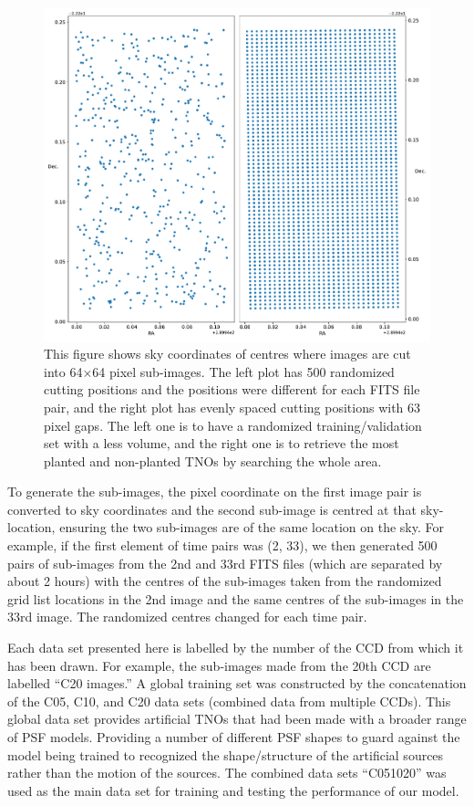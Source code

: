 \begin{figure}[ht]
    \centering
    \includegraphics[width=\textwidth,keepaspectratio]{Figures/grid.pdf}
    \caption{This figure shows sky coordinates of centres where images are cut into 64$\times$64 pixel sub-images.
    The left plot has 500 randomized cutting positions and the positions were different for each FITS file pair, and the right plot has evenly spaced cutting positions with 63 pixel gaps.
    The left one is to have a randomized training/validation set with a less volume, and the right one is to retrieve the most planted and non-planted TNOs by searching the whole area.}
    \label{fig:grid}
\end{figure}

To generate the sub-images, the pixel coordinate on the first image pair is converted to sky coordinates and the second sub-image is centred at that sky-location, ensuring the two sub-images are of the same location on the sky.
For example, if the first element of time pairs was (2, 33), we then generated 500 pairs of sub-images from the 2nd and 33rd FITS files (which are separated by about 2 hours) with the centres of the sub-images taken from the randomized grid list locations in the 2nd image and the same centres of the sub-images in the 33rd image. The randomized centres changed for each time pair.

Each data set presented here is labelled by the number of the CCD from which it has been drawn.  For example, the sub-images made from the 20th CCD are labelled ``C20 images.'' 
A global training set was constructed by the concatenation of the C05, C10, and C20 data sets (combined data from multiple CCDs).  
This global data set provides artificial TNOs that had been made with a broader range of PSF models. 
Providing a number of different PSF shapes to guard against the model being trained to recognized the shape/structure of the artificial sources rather than the motion of the sources.
The combined data sets ``C051020'' was used as the main data set for training and testing the performance of our model.

